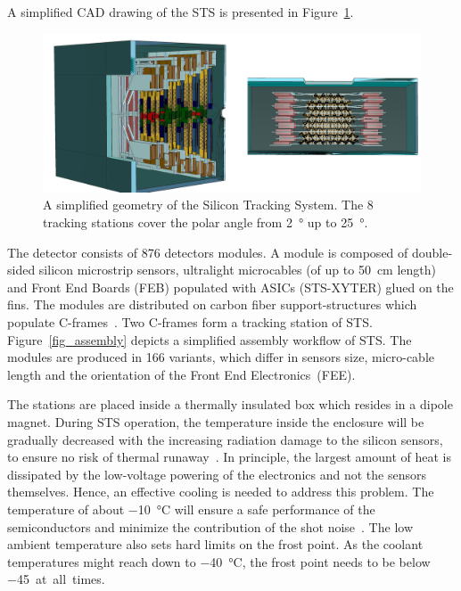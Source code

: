 A simplified CAD drawing of the \gls{STS} is presented in Figure~\ref{fig_STS}. 

\begin{figure}[!h]
\centering
\includegraphics[width=0.85\columnwidth]{Chapter2/images/STS.png}
\caption{A simplified geometry of the Silicon Tracking System. The 8 tracking stations cover the polar angle from \SI{2}{\degree} up to \SI{25}{\degree}.}
\label{fig_STS}
\end{figure}

The detector consists of 876 detectors modules. A module is composed of double-sided silicon microstrip sensors, ultralight microcables (of up to 50~cm length) and Front End Boards (\gls{FEB}) populated with ASICs (STS-XYTER) glued on the fins. The modules are distributed on carbon fiber support-structures which populate C-frames~\cite{progress_report_2016}. Two C-frames form a tracking station of \gls{STS}.  Figure~\ref{fig_assembly} depicts a simplified assembly workflow of \gls{STS}.
The modules are produced in 166 variants, which differ in sensors size, micro-cable length and the orientation of the Front End Electronics~(\gls{FEE}).  


The stations are placed inside a thermally insulated box which resides in a dipole magnet. During \gls{STS} operation, the temperature inside the enclosure will be gradually decreased with the increasing radiation damage to the silicon sensors, to ensure no risk of thermal runaway~\cite{Spieler}. In principle, the largest amount of heat is dissipated by the low-voltage powering of the electronics and not the sensors themselves. Hence, an effective cooling is needed to address this problem.
The temperature of about \SI{-10}{\celsius} will ensure a safe performance of the semiconductors and minimize the contribution of the shot noise~\cite{Spieler}. The low ambient temperature also sets hard limits on the frost point. As the coolant temperatures might reach down to \SI{-40}{\celsius}, the frost point needs to be below \SI{-45} at all times. 

